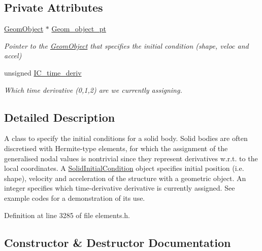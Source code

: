\subsection*{Private Attributes}
\begin{DoxyCompactItemize}
\item 
\hyperlink{classoomph_1_1GeomObject}{Geom\+Object} $\ast$ \hyperlink{classoomph_1_1SolidInitialCondition_ab88fd7c7d57d8d340a012b277a12128f}{Geom\+\_\+object\+\_\+pt}
\begin{DoxyCompactList}\small\item\em Pointer to the \hyperlink{classoomph_1_1GeomObject}{Geom\+Object} that specifies the initial condition (shape, veloc and accel) \end{DoxyCompactList}\item 
unsigned \hyperlink{classoomph_1_1SolidInitialCondition_aae8a896ccc0c0565922cb60f4f7ebd15}{I\+C\+\_\+time\+\_\+deriv}
\begin{DoxyCompactList}\small\item\em Which time derivative (0,1,2) are we currently assigning. \end{DoxyCompactList}\end{DoxyCompactItemize}


\subsection{Detailed Description}
A class to specify the initial conditions for a solid body. Solid bodies are often discretised with Hermite-\/type elements, for which the assignment of the generalised nodal values is nontrivial since they represent derivatives w.\+r.\+t. to the local coordinates. A \hyperlink{classoomph_1_1SolidInitialCondition}{Solid\+Initial\+Condition} object specifies initial position (i.\+e. shape), velocity and acceleration of the structure with a geometric object. An integer specifies which time-\/derivative derivative is currently assigned. See example codes for a demonstration of its use. 

Definition at line 3285 of file elements.\+h.



\subsection{Constructor \& Destructor Documentation}
\mbox{\label{classoomph_1_1SolidInitialCondition_acbadca9acd23896ac9a83a122784f451}} 
